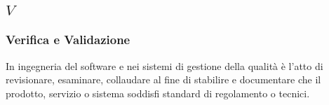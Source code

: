 \subsection*{\quad$V\quad$}

\subsubsection*{Verifica e Validazione}
In ingegneria del software e nei sistemi di gestione della qualità è l'atto di revisionare, esaminare, collaudare al fine di stabilire e documentare che il prodotto, servizio o sistema soddisfi standard di regolamento o tecnici.